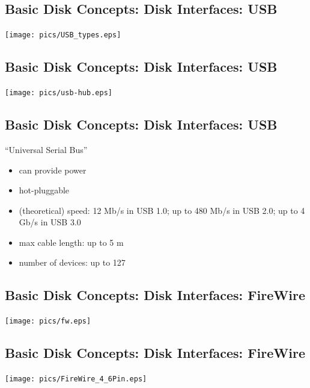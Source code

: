 \documentclass[xga]{xdvislides}
\begin{document}
\subsection{Basic Disk Concepts: Disk Interfaces: USB}
\vfill
	\begin{center}
		\texttt{[image: pics/USB\_types.eps]} \\
	\end{center}
\vfill

\subsection{Basic Disk Concepts: Disk Interfaces: USB}
\vfill
	\begin{center}
		\texttt{[image: pics/usb-hub.eps]} \\
	\end{center}
\vfill

\subsection{Basic Disk Concepts: Disk Interfaces: USB}
``Universal Serial Bus''
\begin{itemize}
	\item can provide power
	\item hot-pluggable
	\item (theoretical) speed: 12 Mb/s in USB 1.0; up to 480 Mb/s in USB 2.0; up to 4 Gb/s in USB 3.0
	\item max cable length: up to 5 m
	\item number of devices: up to 127
\end{itemize}



\subsection{Basic Disk Concepts: Disk Interfaces: FireWire}
\vfill
	\begin{center}
		\texttt{[image: pics/fw.eps]} \\
	\end{center}
\vfill


\subsection{Basic Disk Concepts: Disk Interfaces: FireWire}
\vfill
	\begin{center}
		\texttt{[image: pics/FireWire\_4\_6Pin.eps]} \\
	\end{center}
\vfill
\end{document}
